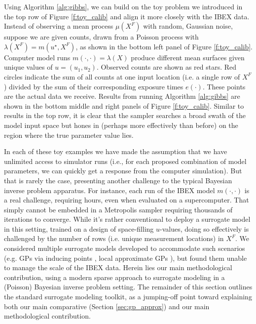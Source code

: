 \documentclass[11pt]{article}
\begin{document}
Using Algorithm \ref{alg:gibbs}, we can build on the toy problem we introduced
in {\color{red}the top row of} Figure \ref{f:toy_calib} and align it more
closely with the IBEX data. Instead of observing a mean process $\mu(X^F)$
with random, Gaussian noise, suppose we are given counts, drawn from a Poisson
process with $\lambda(X^F) = m(u^\star, X^F)$, as shown in the
{\color{red}bottom} left panel of Figure \ref{f:toy_calib}. Computer model
runs $m(\cdot,\cdot) = \lambda(X)$ produce different mean surfaces given
unique values of $u = (u_1, u_2)$. Observed counts are shown as red stars. Red
circles indicate the sum of all counts at one input location (i.e. a single
row of $X^F$) divided by the sum of their corresponding exposure times
$e(\cdot)$. These points are the actual data we receive. Results from running
Algorithm \ref{alg:gibbs} are shown in the {\color{red}bottom} middle and
right panels of Figure \ref{f:toy_calib}. Similar to results in
{\color{red} the top row}, it is clear that the sampler searches a broad swath
of the model input space but hones in {\color{red}(perhaps more effectively
than before)} on the region where the true parameter value lies.

In each of these toy examples we have made the assumption that we have unlimited
access to simulator runs (i.e., for each proposed combination of model
parameters, we can quickly get a response from the computer simulation). But
that is rarely the case, presenting another challenge to the typical Bayesian
inverse problem apparatus. For instance, each run of the IBEX model $m(\cdot,
\cdot)$ is a real challenge, requiring hours, even when evaluated on a
supercomputer.  That simply cannot be embedded in a Metropolis sampler
requiring thousands of iterations to converge.  While it's rather conventional
to deploy a surrogate model \citep[e.g.][]{gramacy2020surrogates} in this
setting, trained on a design of space-filling $u$-values, doing so effectively
is challenged by the number of rows (i.e. unique measurement locations) in
$X^F$.  We considered multiple surrogate models developed to accommodate such
scenarios (e.g. GPs via inducing points \citep{banerjee2008gaussian}, local
approximate GPs \citep{gramacy2014lagp}), but found them unable to manage the
scale of the IBEX data. Herein lies our main methodological contribution, using
a modern sparse approach to surrogate modeling in a (Poisson) Bayesian inverse
problem setting. The remainder of this section outlines the standard surrogate
modeling toolkit, as a jumping-off point toward explaining both our main
comparative (Section \ref{sec:gp_approx}) and our main methodological
contribution.
\end{document}
